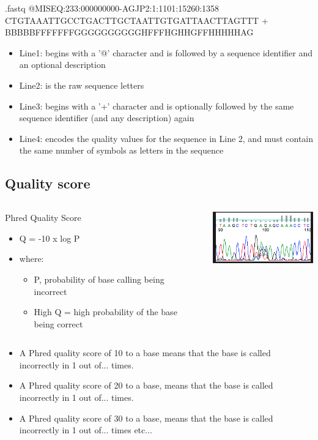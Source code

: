 \documentclass{beamer}\usepackage[]{graphicx}\usepackage[]{color}
\begin{document}
\begin{frame}
\begin{block}{.fastq}
@MISEQ:233:000000000-AGJP2:1:1101:15260:1358
CTGTAAATTGCCTGACTTGCTAATTGTGATTAACTTAGTTT \newline
+ \newline
BBBBBFFFFFFFGGGGGGGGGGHFFFHGHHGFFHHHHHAG
\end{block}
\begin{itemize}
\item Line1: \pause begins with a '@' character and is followed by a sequence identifier and an optional description 
\item Line2: \pause is the raw sequence letters 
\item Line3: \pause begins with a '+' character and is optionally followed by the same sequence identifier (and any description) again 
\item Line4: \pause encodes the quality values for the sequence in Line 2, and must contain the same number of symbols as letters in the sequence
\end{itemize}
\end{frame}

\subsection{Quality score}
\begin{frame}
\begin{columns}
\column{6cm}
\centering
\begin{block}{Phred Quality Score}
\begin{itemize}
\item Q = -10 x log P
\item where:
\begin{itemize}
\item P, probability of base calling being incorrect
\item High Q = high probability of the base being correct
\end{itemize}
\end{itemize}
\end{block}
\column{6cm}
\centering
\includegraphics[width=5cm]{Images/phred.png}
\end{columns}
\begin{itemize}
\item A Phred quality score of 10 to a base means that the base is called incorrectly in 1 out of... times.
\item A Phred quality score of 20 to a base, means that the base is called incorrectly in 1 out of... times.
\item A Phred quality score of 30 to a base, means that the base is called incorrectly in 1 out of... times etc...
\end{itemize}
\end{frame}
\end{document}

